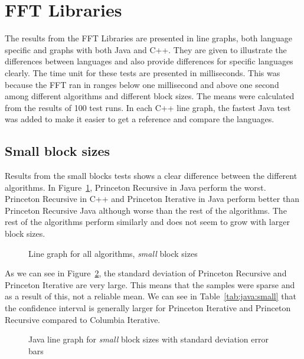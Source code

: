 \section{FFT Libraries}
The results from the FFT Libraries are presented in line graphs, both language specific and graphs with both Java and C++. They are given to illustrate the differences between languages and also provide differences for specific languages clearly. The time unit for these tests are presented in milliseconds. This was because the FFT ran in ranges below one millisecond and above one second among different algorithms and different block sizes. The means were calculated from the results of 100 test runs.  In each C++ line graph, the fastest Java test was added to make it easier to get a reference and compare the languages.

\subsection{Small block sizes}
Results from the small blocks tests shows a clear difference between the different algorithms. In Figure~\ref{fig:all:line:small}, Princeton Recursive in Java perform the worst. Princeton Recursive in C++ and Princeton Iterative in Java perform better than Princeton Recursive Java although worse than the rest of the algorithms. The rest of the algorithms perform similarly and does not seem to grow with larger block sizes.

\ifrelease
\begin{figure}
    \centering
    
    \caption{Line graph for all algorithms, \emph{small} block sizes}
    \label{fig:all:line:small}
\end{figure}
\fi

As we can see in Figure~\ref{fig:java:line:small}, the standard deviation of Princeton Recursive and Princeton Iterative are very large. This means that the samples were sparse and as a result of this, not a reliable mean. We can see in Table~\ref{tab:java:small} that the confidence interval is generally larger for Princeton Iterative and Princeton Recursive compared to Columbia Iterative.

\ifrelease
\begin{figure}
    \centering
    
    \caption{Java line graph for \emph{small} block sizes with standard deviation error bars}
    \label{fig:java:line:small}
\end{figure}
\fi

